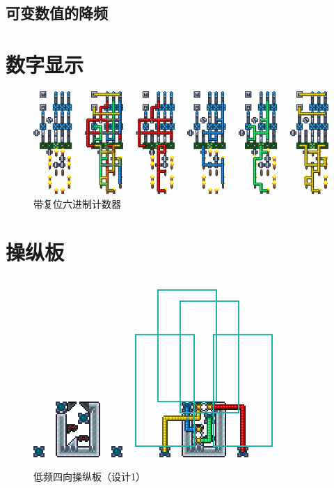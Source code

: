 \subsection{可变数值的降频}

\section{数字显示}
\begin{figure}[!ht]
    \centering
    \includegraphics[width=\textwidth]{images/347.png}
    \caption{带复位六进制计数器}
\end{figure}

\section{操纵板}

\begin{figure}[!ht]
    \centering
    \includegraphics{images/253.png}
    \qquad
    \includegraphics{images/254.png}
    \caption{低频四向操纵板（设计1）}
\end{figure}